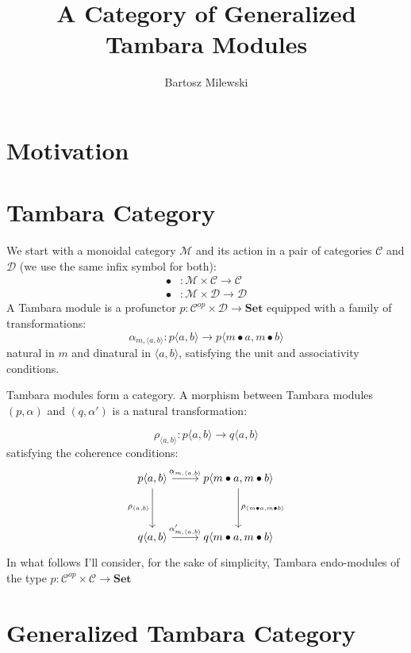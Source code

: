 \documentclass[11pt]{amsart}
\author{Bartosz Milewski}
\title{A Category of Generalized Tambara Modules}
\newcommand{\cat}[1]{\mathcal{#1}}%
\newcommand{\Cat}[1]{\mathbf{#1}}%
\begin{document}
\maketitle{}

\section{Motivation}

\section{Tambara Category}

We start with a monoidal category $\cat M$ and its action in a pair of categories $\cat C$ and $ \cat D$ (we use the same infix symbol for both):
\begin{align*} 
\bullet &\colon \cat M \times \cat C \to \cat C 
\\
 \bullet &\colon \cat M \times \cat D \to \cat D 
\end{align*}
A Tambara module is a profunctor $p \colon \cat C^{op} \times \cat D \to \Cat{Set}$ equipped with a family of transformations:
\[ \alpha_{m, \langle a, b \rangle} \colon p \langle a, b \rangle \to p \langle m \bullet a, m \bullet b \rangle \]
natural in $m$ and dinatural in $\langle a, b \rangle$, satisfying the unit and associativity conditions. 

Tambara modules form a category.  A morphism between Tambara modules $(p, \alpha)$ and $(q, \alpha')$ is a natural transformation:

\[ \rho_{\langle a, b \rangle} \colon p \langle a, b \rangle \to q \langle a, b \rangle \]
 satisfying the coherence conditions:
\[
 \begin{tikzcd}
 p \langle a, b \rangle
 \arrow[r, "{\alpha_{m, \langle a, b \rangle}}"]
 \arrow[dd, "{\rho_{ \langle a, b \rangle}}"']
& p \langle m \bullet a, m \bullet b \rangle
 \arrow[dd, "{\rho_{\langle m \bullet a, m \bullet b \rangle}}"]
 \\
  \\
 q \langle a, b \rangle
 \arrow[r, "{\alpha'_{m, \langle a, b \rangle}}"]
& q \langle m \bullet a, m \bullet b \rangle
 \end{tikzcd}
\]
In what follows I'll consider, for the sake of simplicity, Tambara endo-modules of the type  $p \colon \cat C^{op} \times \cat C \to \Cat{Set}$

\section{Generalized Tambara Category}
\end{document}
